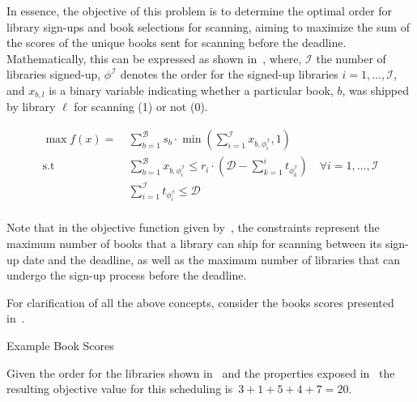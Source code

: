 In essence, the objective of this problem is to determine the optimal order for
library sign-ups and book selections for scanning, aiming to maximize the sum of
the scores of the unique books sent for scanning before the deadline.
Mathematically, this can be expressed as shown in~, where,
$\mathcal{I}$ the number of libraries signed-up, $\phi^\mathcal{I}$ denotes the
order for the signed-up libraries $i = 1, \ldots, \mathcal{I}$, and $x_{b,l}$ is
a binary variable indicating whether a particular book, $b$, was shipped by
library $\ell$ for scanning (1) or not (0).

\begin{equation}
  \label{eq:bs-objective}
  \begin{aligned}
    \max{f(x)} =\  & \sum_{b = 1}^{\mathcal{B}}{s_{b} \cdot \min\left(\sum_{i = 1}^{\mathcal{I}}{x_{b, \phi_{i}^\mathcal{I}}} , 1\right)}                                                                     \\
    \text{s.t }    & \sum_{b = 1}^{\mathcal{B}}{x_{b, \phi_{i}^\mathcal{I}}} \leq r_{i} \cdot \left(\mathcal{D} - \sum_{k = 1}^{i}{t_{\phi_{k}^\mathcal{I}}} \right) \quad \forall i = 1, \ldots, \mathcal{I} \\
                   & \sum_{i = 1}^{\mathcal{I}}{t_{\phi_{i}^\mathcal{I}}} \leq \mathcal{D}                                                                                                                    \\
  \end{aligned}
\end{equation}

Note that in the objective function given by~, the
constraints represent the maximum number of books that a library can ship for
scanning between its sign-up date and the deadline, as well as the maximum
number of libraries that can undergo the sign-up process before the deadline.

For clarification of all the above concepts, consider the books scores presented
in~.

\begin{table}[ht]
  \centering
  
  \caption{Example Book Scores}
  \label{tab:bs-example}
\end{table}

Given the order for the libraries shown in~ and the
properties exposed in~ the resulting objective
value for this scheduling is~$3 + 1 + 5 + 4 + 7 = 20$.

